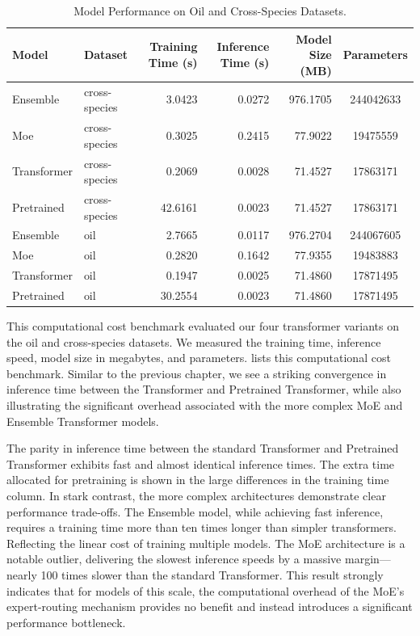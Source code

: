 \begin{table}
\small %
\centering
\caption{Model Performance on Oil and Cross-Species Datasets.}
\label{tab:model_performance_oil_cs}
\begin{tabular}{llrrrc}
\toprule
Model & Dataset & Training Time (s) & Inference Time (s) & Model Size (MB) & Parameters \\
\midrule
Ensemble & cross-species & 3.0423 & 0.0272 & 976.1705 & 244042633 \\
Moe & cross-species & 0.3025 & 0.2415 & 77.9022 & 19475559 \\
Transformer & cross-species & 0.2069 & 0.0028 & 71.4527 & 17863171 \\
Pretrained & cross-species & 42.6161 & 0.0023 & 71.4527 & 17863171 \\
Ensemble & oil & 2.7665 & 0.0117 & 976.2704 & 244067605 \\
Moe & oil & 0.2820 & 0.1642 & 77.9355 & 19483883 \\
Transformer & oil & 0.1947 & 0.0025 & 71.4860 & 17871495 \\
Pretrained & oil & 30.2554 & 0.0023 & 71.4860 & 17871495 \\
\bottomrule
\end{tabular}
\end{table}

This computational cost benchmark evaluated our four transformer variants on the oil and cross-species datasets. We measured the training time, inference speed, model size in megabytes, and parameters.  lists this computational cost benchmark. Similar to the previous chapter, we see a striking convergence in inference time between the Transformer and Pretrained Transformer, while also illustrating the significant overhead associated with the more complex MoE and Ensemble Transformer models.

The parity in inference time between the standard Transformer and Pretrained Transformer exhibits fast and almost identical inference times. The extra time allocated for pretraining is shown in the large differences in the training time column. In stark contrast, the more complex architectures demonstrate clear performance trade-offs. The Ensemble model, while achieving fast inference, requires a training time more than ten times longer than simpler transformers. Reflecting the linear cost of training multiple models. The MoE architecture is a notable outlier,  delivering the slowest inference speeds by a massive margin—nearly 100 times slower than the standard Transformer. This result strongly indicates that for models of this scale, the computational overhead of the MoE's expert-routing mechanism provides no benefit and instead introduces a significant performance bottleneck.

